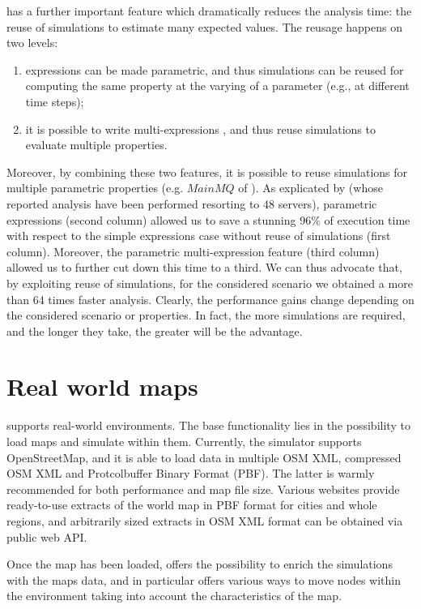 \documentclass[12pt,a4paper,twoside,openright]{book}
\begin{document}
\multivesta{} has a further important feature which dramatically reduces the analysis time: the reuse of simulations to estimate many expected values. 
%
The reusage happens on two levels:
\begin{enumerate}
 \item expressions can be made parametric, and thus simulations can be reused for computing the same property at the varying of a parameter (e.g., at different time steps);
 \item it is possible to write multi-expressions , and thus reuse simulations to evaluate multiple properties.
\end{enumerate}
%
Moreover,  by combining these two features, it is possible to reuse simulations for multiple parametric properties (e.g. $MainMQ$ of ).
%
As explicated by  (whose reported analysis have been performed resorting to 48 servers), 	parametric expressions (second column) allowed us to save a stunning {%
96}\% of execution time with respect to the simple expressions case without reuse of simulations (first column). Moreover, the parametric multi-expression feature (third column) allowed us to further cut down this time to a third.
%
We can thus advocate that, by exploiting reuse of simulations, for the considered scenario we obtained a more than 64 times faster analysis.
%
Clearly, the performance gains change depending on the considered scenario or properties. In fact, the more simulations are required, and the longer they take, the greater will be the advantage.

\section{Real world maps}

\alchemist{} supports real-world environments.
%
The base functionality lies in the possibility to load maps and simulate within them.
%
Currently, the simulator supports OpenStreetMap\cite{osm}, and it is able to load data in multiple OSM XML, compressed OSM XML and Protcolbuffer Binary Format (PBF).
%
The latter is warmly recommended for both performance and map file size.
%
Various websites provide ready-to-use extracts of the world map in PBF format for cities and whole regions, and arbitrarily sized extracts in OSM XML format can be obtained via public web API.

Once the map has been loaded, \alchemist{} offers the possibility to enrich the simulations with the maps data, and in particular offers various ways to move nodes within the environment taking into account the characteristics of the map.
\end{document}
